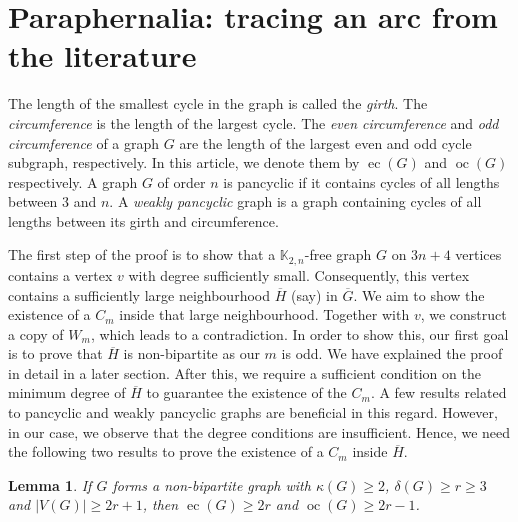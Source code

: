 \documentclass[reqno,10pt]{amsart}
\newtheorem{lemma}[theorem]{Lemma}
\theoremstyle{definition}
\begin{document}


\section{Paraphernalia: tracing an arc from the literature}

The length of the smallest cycle in the graph is called the \emph{girth}. The \emph{circumference} is the length of the largest cycle. The \emph{ even circumference} and \emph{odd circumference} of a graph $G$ are the length of the largest even and odd cycle subgraph, respectively. In this article, we denote them by $\mathop{ec}(G)$ and $\mathop{oc}(G)$ respectively. A graph $G$ of order $n$ is pancyclic if it contains cycles of all lengths between $3$ and $n$. A \emph{weakly pancyclic} graph is a graph containing cycles of all lengths between its girth and circumference. 

The first step of the proof is to show that a $\mathbb{K}_{2,n}$-free graph $G$ on $3n+4$ vertices contains a vertex $v$ with degree sufficiently small. Consequently, this vertex contains a sufficiently large neighbourhood $\overline{H}$ (say) in $\overline{G}$. We aim to show the existence of a $C_{m}$ inside that large neighbourhood. Together with $v$, we construct a copy of $W_{m}$, which leads to a contradiction. In order to show this, our first goal is to prove that $\overline{H}$ is non-bipartite as our $m$ is odd. We have explained the proof in detail in a later section. After this, we require a sufficient condition on the minimum degree of $\overline{H}$ to guarantee the existence of the $C_{m}$. A few results related to pancyclic and weakly pancyclic graphs are beneficial in this regard. However, in our case, we observe that the degree conditions are insufficient. Hence, we need the following two results to prove the existence of a $C_{m}$ inside $\overline{H}$. %

\begin{lemma}\label{cycle lemma 1}\cite{MR1005319}
If $G$ forms a non-bipartite graph with $\kappa(G)\geq2$, $\delta(G)\geq r\geq3$ and $|V(G)|\geq 2r+1$, then $\mathop{ec}(G)\geq 2r$ and $\mathop{oc}(G)\geq 2r-1$. 
\end{lemma}
\end{document}
